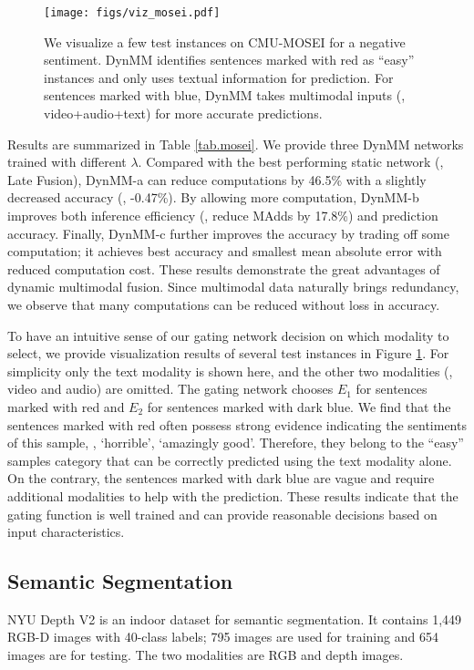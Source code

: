 \begin{figure}[!t]
  \centering
  \texttt{[image: figs/viz\_mosei.pdf]}
  \caption{We visualize a few test instances on CMU-MOSEI for a negative sentiment. DynMM identifies sentences marked with red as ``easy'' instances and only uses textual information for prediction. For sentences marked with blue, DynMM takes multimodal inputs (\ie, video+audio+text) for more accurate predictions. }
  \label{fig.viz_mosei}
\end{figure}

Results are summarized in Table \ref{tab.mosei}. We provide three DynMM networks trained with different $\lambda$. Compared with the best performing static network (\ie, Late Fusion), DynMM-a can reduce computations by 46.5\% with a slightly decreased accuracy (\ie, -0.47\%). By allowing more computation, DynMM-b improves both inference efficiency (\ie, reduce MAdds by 17.8\%) and prediction accuracy. Finally, DynMM-c further improves the accuracy by trading off some computation; it achieves best accuracy and smallest mean absolute error with reduced computation cost. These results demonstrate the great advantages of dynamic multimodal fusion. Since multimodal data naturally brings redundancy, we observe that many computations can be reduced without loss in accuracy. 


To have an intuitive sense of our gating network decision on which modality to select, we provide visualization results of several test instances in Figure \ref{fig.viz_mosei}. For simplicity only the text modality is shown here, and the other two modalities (\ie, video and audio) are omitted. The gating network chooses $E_1$ for sentences marked with red and $E_2$ for sentences marked with dark blue. We find that the sentences marked with red often possess strong evidence indicating the sentiments of this sample, \eg, `horrible', `amazingly good'. Therefore, they belong to the ``easy'' samples category that can be correctly predicted using the text modality alone. On the contrary, the sentences marked with dark blue are vague and require additional modalities to help with the prediction. These results indicate that the gating function is well trained and can provide reasonable decisions based on input characteristics.

\subsection{Semantic Segmentation}

NYU Depth V2 is an indoor dataset for semantic segmentation. It contains 1,449 RGB-D images with 40-class labels; 795 images are used for training and 654 images are for testing. The two modalities are RGB and depth images.     






